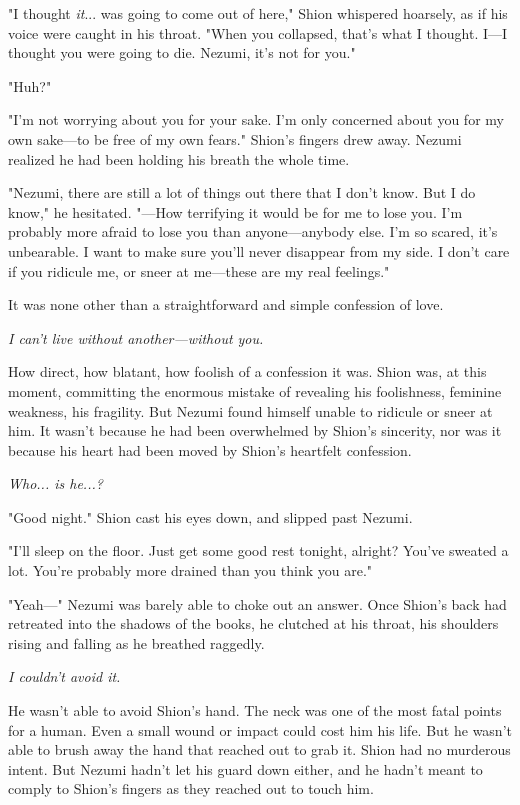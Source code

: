 "I thought \emph{it}... was going to come out of here," Shion whispered
hoarsely, as if his voice were caught in his throat. "When you
collapsed, that's what I thought. I---I thought you were going to die.
Nezumi, it's not for you."

"Huh?"

"I'm not worrying about you for your sake. I'm only concerned about you
for my own sake---to be free of my own fears." Shion's fingers drew away.
Nezumi realized he had been holding his breath the whole time.

"Nezumi, there are still a lot of things out there that I don't know.
But I do know," he hesitated. "---How terrifying it would be for me to
lose you. I'm probably more afraid to lose you than anyone---anybody else.
I'm so scared, it's unbearable. I want to make sure you'll never
disappear from my side. I don't care if you ridicule me, or sneer at
me---these are my real feelings."

It was none other than a straightforward and simple confession of love.

\emph{I can't live without another---without you.}

How direct, how blatant, how foolish of a confession it was. Shion was,
at this moment, committing the enormous mistake of revealing his
foolishness, feminine weakness, his fragility. But Nezumi found himself
unable to ridicule or sneer at him. It wasn't because he had been
overwhelmed by Shion's sincerity, nor was it because his heart had been
moved by Shion's heartfelt confession.

\emph{Who... is he...?}

"Good night." Shion cast his eyes down, and slipped past Nezumi.

"I'll sleep on the floor. Just get some good rest tonight, alright?
You've sweated a lot. You're probably more drained than you think you
are."

"Yeah---" Nezumi was barely able to choke out an answer. Once Shion's back
had retreated into the shadows of the books, he clutched at his throat,
his shoulders rising and falling as he breathed raggedly.

\emph{I couldn't avoid it.}

He wasn't able to avoid Shion's hand. The neck was one of the most fatal
points for a human. Even a small wound or impact could cost him his
life. But he wasn't able to brush away the hand that reached out to grab
it. Shion had no murderous intent. But Nezumi hadn't let his guard down
either, and he hadn't meant to comply to Shion's fingers as they reached
out to touch him.

